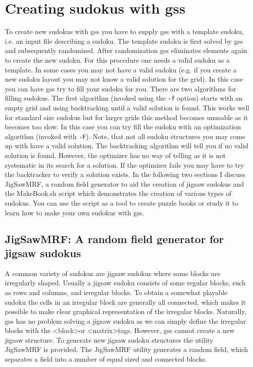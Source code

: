 \documentclass[12pt]{article}
\begin{document}
\section{\label{util}Creating sudokus with gss}
To create new sudokus with gss you have to supply gss with a template sudoku, i.e. an input file describing a sudoku. The template sudoku is first solved by gss and subsequently randomized. After randomization gss eliminates elements again to create the new sudoku. For this procedure one needs a valid sudoku as a template. In some cases you may not have a valid sudoku (e.g. if you create a new sudoku layout you may not know a valid solution for the grid). In this case you can have gss try to fill your sudoku for you. There are two algorithms for filling sudokus. The first algorithm (invoked using the \texttt{-f} option) starts with an empty grid and using backtracking until a valid solution is found. This works well for standard size sudokus but for larger grids this method becomes unusable as it becomes too slow. In this case you can try fill the sudoku with an optimization algorithm (invoked with \texttt{-F}). Note, that not all sudoku structures you may come up with have a valid solution. The backtracking algorithm will tell you if no valid solution is found. However, the optimizer has no way of telling as it is not systematic in its search for a solution. If the optimizer fails you may have to try the backtracker to verify a solution exists. In the following two sections I discuss JigSawMRF, a random field generator to aid the creation of jigsaw sudokus and the MakeBook.sh script which demonstrates the creation of various types of sudokus. You can use the script as a tool to create puzzle books or study it to learn how to make your own sudokus with gss.


\subsection{\label{jig}JigSawMRF: A random field generator for jigsaw sudokus}
A common variety of sudokus are jigsaw sudokus where some blocks are irregularly shaped. Usually a jigsaw sudoku consists of some regular blocks, such as rows and columns, and irregular blocks. To obtain a somewhat playable sudoku the cells in an irregular block are generally all connected, which makes it possible to make clear graphical representation of the irregular blocks. Naturally, gss has no problem solving a jigsaw sudoku as we can simply define the irregular blocks with the \textless block\textgreater  or \textless matrix\textgreater  tags. However, gss cannot create a new jigsaw structure. To generate new jigsaw sudoku structures the utility JigSawMRF is provided. The JigSawMRF utility generates a random field, which separates a field into a number of equal sized and connected blocks.
\end{document}
